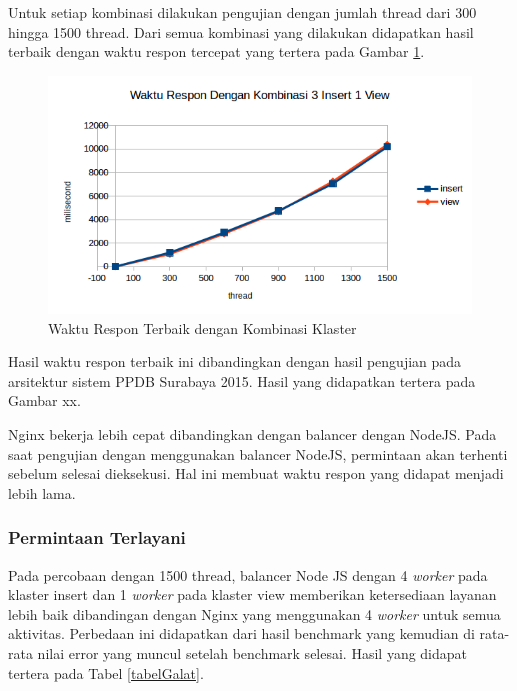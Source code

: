 \documentclass{ta-its}
\begin{document}
					
					
					Untuk setiap kombinasi dilakukan pengujian dengan jumlah thread dari 300 hingga 1500 thread. Dari semua kombinasi yang dilakukan didapatkan hasil terbaik dengan waktu respon tercepat yang tertera pada Gambar \ref{gambarResponTerbaik}.
					
					\begin{figure}[h] %
						\centering
						\includegraphics[width=\linewidth]{contoh_img/viewworker2gb}
						\caption{Waktu Respon Terbaik dengan Kombinasi Klaster}
						\label{gambarResponTerbaik}
					\end{figure}
					
					Hasil waktu respon terbaik ini dibandingkan dengan hasil pengujian pada arsitektur sistem PPDB Surabaya 2015. Hasil yang didapatkan tertera pada Gambar xx.
					
					
					Nginx bekerja lebih cepat dibandingkan dengan balancer dengan NodeJS. Pada saat pengujian dengan menggunakan balancer NodeJS, permintaan akan terhenti sebelum selesai dieksekusi. Hal ini membuat waktu respon yang didapat menjadi lebih lama.
					
				\subsubsection{Permintaan Terlayani}
					Pada percobaan dengan 1500 thread, balancer Node JS dengan 4 \textit{worker} pada klaster insert dan 1 \textit{worker} pada klaster view memberikan ketersediaan layanan lebih baik dibandingan dengan Nginx yang menggunakan 4 \textit{worker} untuk semua aktivitas. Perbedaan ini didapatkan dari hasil benchmark yang kemudian di rata-rata nilai error yang muncul setelah benchmark selesai. Hasil yang didapat
					tertera pada Tabel \ref{tabelGalat}.
					
\end{document}

